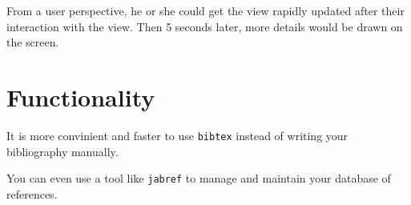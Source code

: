 \documentclass[MSc]{icldt}
\begin{document}
From a user perspective, he or she could get the view rapidly updated after their interaction with the view. Then 5 seconds later, more details would be drawn on the screen.

\chapter{Functionality}


\begin{thebibliography}{123}
\raggedright

 It is more convinient and faster to use \texttt{bibtex} instead 
of writing your bibliography manually.

You can even use a tool like \texttt{jabref} to manage and maintain your 
database of references.

\end{thebibliography}
\end{document}

